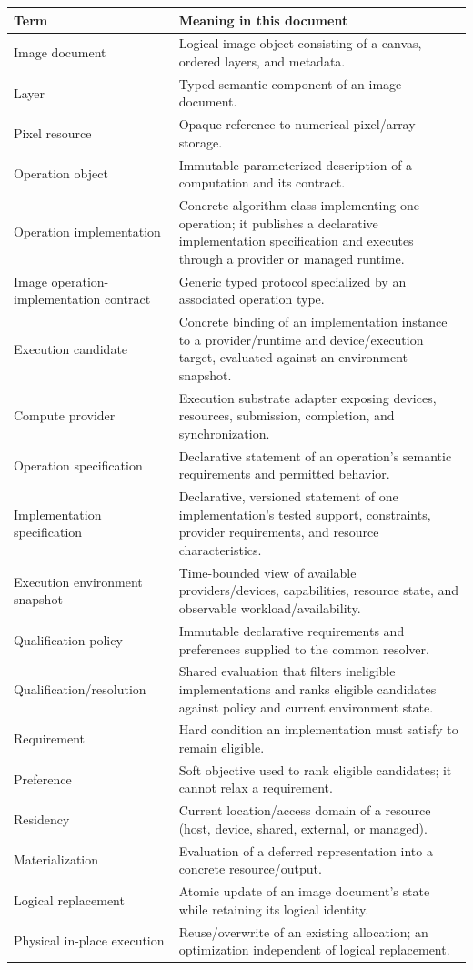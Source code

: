 \documentclass[11pt,a4paper,oneside]{article}
\begin{document}
\begin{longtable}{@{}L{0.25\textwidth}Z{0.69\textwidth}@{}}
\toprule
\textbf{Term} & \textbf{Meaning in this document} \\
\midrule
Image document & Logical image object consisting of a canvas, ordered layers, and metadata. \\
Layer & Typed semantic component of an image document. \\
Pixel resource & Opaque reference to numerical pixel/array storage. \\
Operation object & Immutable parameterized description of a computation and its contract. \\
Operation implementation & Concrete algorithm class implementing one operation; it publishes a declarative implementation specification and executes through a provider or managed runtime. \\ 
Image operation-implementation contract & Generic typed protocol specialized by an associated operation type. \\ 
Execution candidate & Concrete binding of an implementation instance to a provider/runtime and device/execution target, evaluated against an environment snapshot. \\
Compute provider & Execution substrate adapter exposing devices, resources, submission, completion, and synchronization. \\
Operation specification & Declarative statement of an operation's semantic requirements and permitted behavior. \\
Implementation specification & Declarative, versioned statement of one implementation's tested support, constraints, provider requirements, and resource characteristics. \\
Execution environment snapshot & Time-bounded view of available providers/devices, capabilities, resource state, and observable workload/availability. \\
Qualification policy & Immutable declarative requirements and preferences supplied to the common resolver. \\
Qualification/resolution & Shared evaluation that filters ineligible implementations and ranks eligible candidates against policy and current environment state. \\
Requirement & Hard condition an implementation must satisfy to remain eligible. \\
Preference & Soft objective used to rank eligible candidates; it cannot relax a requirement. \\


Residency & Current location/access domain of a resource (host, device, shared, external, or managed). \\
Materialization & Evaluation of a deferred representation into a concrete resource/output. \\
Logical replacement & Atomic update of an image document's state while retaining its logical identity. \\
Physical in-place execution & Reuse/overwrite of an existing allocation; an optimization independent of logical replacement. \\
\bottomrule
\end{longtable}
\end{document}
